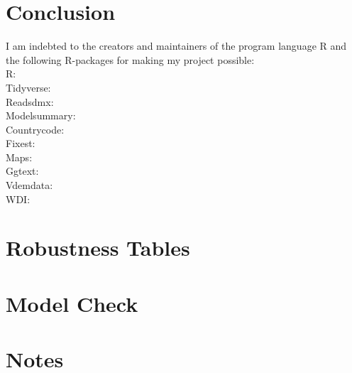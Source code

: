 \documentclass[12pt]{report} %
\begin{document}
\chapter{Conclusion}
 \label{chp:conclusion}



\newpage
\thispagestyle{empty}
\vspace*{\fill}
\begin{center}
    I am indebted to the creators and maintainers of the program language R and the following R-packages for making my project possible: \\
    R: \citet{r_core_team_r_2024} \\
    Tidyverse: \citet{wickham_welcome_2019} \\
    Readsdmx: \citet{queljoe_readsdmx_2023} \\
    Modelsummary: \citet{arel-bundock_modelsummary_2022} \\
    Countrycode: \citet{arel-bundock_countrycode_2018} \\
    Fixest: \citet{berge_efficient_2018} \\
    Maps: \citet{becker_maps_2024} \\
    Ggtext: \citet{wilke_ggtext_2022} \\
    Vdemdata: \citet{maerz_vdemdata_2025} \\
    WDI: \citet{arel-bundock_wdi_2022}
    
\end{center}
\vspace*{\fill}

\newpage

\appendix
\chapter{Robustness Tables} \label{apn:robust}


\chapter{Model Check} \label{apn:models}


\chapter{Notes} \label{apn:notes}

\end{document}
